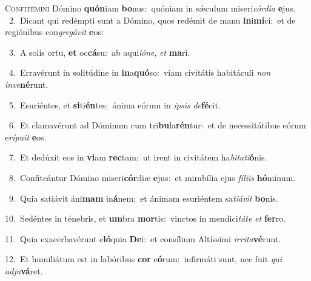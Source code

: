 \lettrine{\initial\textcolor{\initialcolor}{C}}{onfitémini} Dómino \textbf{quón}\-iam \textbf{bo}\-nus:~\star quóniam in sǽculum miseri\-\textit{cór}\-\textit{di}\textit{a} \textbf{e}\-jus.\\
{\numbfont\textcolor{\numbcolor}{~2.}}~Dicant qui redémpti sunt a Dómino, quos redémit de manu \textbf{in}\-i\-\textbf{mí}\-ci:~\star et de regiónibus con\-\textit{gre}\-\textit{gá}\textit{vit} \textbf{e}\-os:\par
{\numbfont\textcolor{\numbcolor}{~3.}}~A solis ortu, \textbf{et} oc\-\textbf{cá}\-su:~\star ab aqui\-\textit{ló}\-\textit{ne}, \textit{et} \textbf{ma}\-ri.\par
{\numbfont\textcolor{\numbcolor}{~4.}}~Erravérunt in solitúdine in \textbf{in}\-a\-\textbf{quó}\-so:~\star viam civitátis habitáculi \textit{non} \textit{in}\-\textit{ve}\textbf{né}runt.\par
{\numbfont\textcolor{\numbcolor}{~5.}}~Esuriéntes, et \textbf{si}\-ti\-\textbf{én}\-tes:~\star ánima eórum in \textit{ip}\-\textit{sis} \textit{de}\-\textbf{fé}cit.\par
{\numbfont\textcolor{\numbcolor}{~6.}}~Et clamavérunt ad Dóminum cum tri\-\textbf{bu}\-la\-\textbf{rén}\-tur:~\star et de necessitátibus eórum e\-\textit{rí}\-\textit{pu}\textit{it} \textbf{e}\-os.\par
{\numbfont\textcolor{\numbcolor}{~7.}}~Et dedúxit eos in \textbf{vi}\-am \textbf{rec}\-tam:~\star ut irent in civitátem ha\-\textit{bi}\-\textit{ta}\textit{ti}\textbf{ó}nis.\par
{\numbfont\textcolor{\numbcolor}{~8.}}~Confiteántur Dómino miseri\-\textbf{cór}\-diæ \textbf{e}\-jus:~\star et mirabília ejus \textit{fí}\-\textit{li}\textit{is} \textbf{hó}\-minum.\par
{\numbfont\textcolor{\numbcolor}{~9.}}~Quia satiávit áni\textbf{mam} in\-\textbf{á}\-nem:~\star et ánimam esuriéntem sa\-\textit{ti}\-\textit{á}\textit{vit} \textbf{bo}\-nis.\par
{\numbfont\textcolor{\numbcolor}{10.}}~Sedéntes in ténebris, et \textbf{um}\-bra \textbf{mor}\-tis:~\star vinctos in mendici\-\textit{tá}\-\textit{te} \textit{et} \textbf{fer}\-ro.\par
{\numbfont\textcolor{\numbcolor}{11.}}~Quia exacerbavérunt e\-\textbf{ló}\-quia \textbf{De}\-i:~\star et consílium Altíssimi \textit{ir}\-\textit{ri}\textit{ta}\textbf{vé}runt.\par
{\numbfont\textcolor{\numbcolor}{12.}}~Et humiliátum est in labóribus \textbf{cor} e\-\textbf{ó}\-rum:~\star infirmáti sunt, nec fuit \textit{qui} \textit{ad}\-\textit{ju}\textbf{vá}ret.\par
